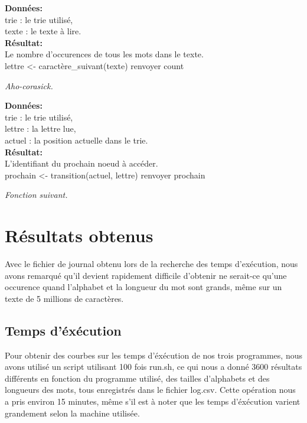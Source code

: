 \begin{algorithm}[H]
    \textbf{Données:}\\
    trie : le trie utilisé,\\
    texte : le texte à lire.\\
    \textbf{Résultat:}\\
    Le nombre d'occurences de tous les mots dans le texte.\\
    lettre <- caractère\_suivant(texte)\;
    renvoyer count\;
\end{algorithm}
\begin{center}\textit{Aho-corasick.}\end{center}

\newpage
\begin{algorithm}[H]
    \textbf{Données:}\\
    trie : le trie utilisé,\\
    lettre : la lettre lue,\\
    actuel : la position actuelle dans le trie.\\
    \textbf{Résultat:}\\
    L'identifiant du prochain noeud à accéder.\\
    prochain <- transition(actuel, lettre)\;
    renvoyer prochain\;
\end{algorithm}
\begin{center}\textit{Fonction suivant.}\end{center}

\section{Résultats obtenus}
Avec le fichier de journal obtenu lors de la recherche des temps d'exécution, nous
avons remarqué qu'il devient rapidement difficile d'obtenir ne serait-ce qu'une occurence
quand l'alphabet et la longueur du mot sont grands, même sur un texte de 5 millions de caractères.

\subsection{Temps d'éxécution}
Pour obtenir des courbes sur les temps d'éxécution de nos trois programmes, nous avons
utilisé un script utilisant 100 fois run.sh, ce qui nous a donné 3600 résultats différents
en fonction du programme utilisé, des tailles d'alphabets et des longueurs
des mots, tous enregistrés dans le fichier log.csv. Cette opération nous a pris
environ 15 minutes, même s'il est à noter que les temps d'éxécution varient grandement
selon la machine utilisée.

